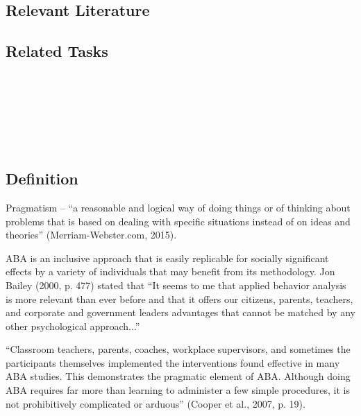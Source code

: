 \subsection{Relevant Literature}
\begin{refsection}
\nocite{test,alang2017police,clayton2018black}
\printbibliography[heading=none]
\end{refsection}
%
\subsection{Related Tasks}
\fourFKOne{}\\ %
\fourFKTwo{}\\ %
\fourFKThree{}\\%
\fourFKFour{}\\%
\fourFKSix{}\\%
%
%
%
%
%
\section{\fourFKSix{}}
\subsection{Definition}
Pragmatism – ``a reasonable and logical way of doing things or of thinking about problems that is based on dealing with specific situations instead of on ideas and theories'' (Merriam-Webster.com, 2015).

ABA is an inclusive approach that is easily replicable for socially significant effects by a variety of individuals that may benefit from its methodology. Jon Bailey (2000, p. 477) stated that ``It seems to me that applied behavior analysis is more relevant than ever before and that it offers our citizens, parents, teachers, and corporate and government leaders advantages that cannot be matched by any other psychological approach...'' 

``Classroom teachers, parents, coaches, workplace supervisors, and sometimes the participants themselves implemented the interventions found effective in many ABA studies. This demonstrates the pragmatic element of ABA. Although doing ABA requires far more than learning to administer a few simple procedures, it is not prohibitively complicated or arduous'' (Cooper et al., 2007, p. 19). 

